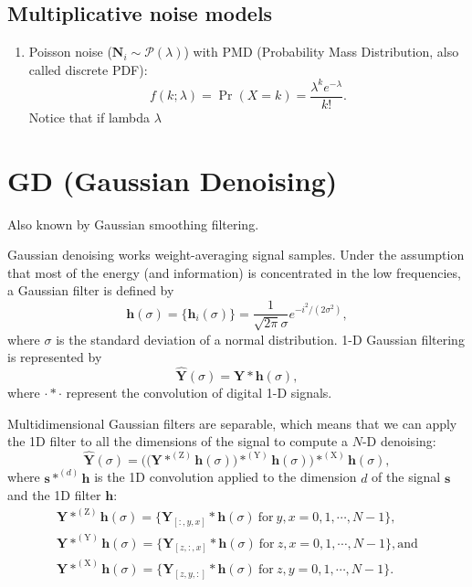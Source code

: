\documentclass{article}
\begin{document}
\subsection{Multiplicative noise models}
\begin{enumerate}
\item Poisson noise ($\mathbf{N}_i\sim\mathcal{P}(\lambda)$) with PMD (Probability Mass Distribution, also
  called discrete PDF):
  \begin{equation}
    f(k; \lambda) = \Pr(X{=}k) = \frac{\lambda^k e^{-\lambda}}{k!}.
  \end{equation}
  Notice that if lambda $\lambda$
\end{enumerate}
\section{GD (Gaussian Denoising)}

Also known by Gaussian smoothing filtering.

Gaussian denoising works weight-averaging signal samples. Under the
assumption that most of the energy (and information) is concentrated
in the low frequencies, a Gaussian filter is defined by
\begin{equation}
  \mathbf{h}(\sigma) = \{\mathbf{h}_i(\sigma)\} = \frac{1}{\sqrt{2\pi}\sigma}e^{{-i}^2/(2\sigma^2)},
\end{equation}
where $\sigma$ is the standard deviation of a normal
distribution. 1-D Gaussian filtering is represented by
\begin{equation}
  \hat{\mathbf{Y}}(\sigma) = \mathbf{Y}*\mathbf{h}(\sigma),
  \label{eq:GF}
\end{equation}
where $\cdot*\cdot$ represent the convolution of digital 1-D signals.

Multidimensional Gaussian filters are separable, which means that we
can apply the 1D filter to all the dimensions of the signal to compute
a $N$-D denoising:
\begin{equation}
  \hat{\mathbf{Y}}(\sigma) = \Big(\big({\mathbf Y}*^{(\text{Z})}{\mathbf h}(\sigma)\big)*^{(\text{Y})}{\mathbf h}(\sigma)\Big)*^{(\text{X})}{\mathbf h}(\sigma),
    \label{eq:3DGF}
\end{equation}
where ${\mathbf s}*^{(d)}{\mathbf h}$ is the 1D convolution applied to
the dimension $d$ of the signal ${\mathbf s}$ and the 1D filter
${\mathbf h}$:
\begin{equation*}
    \begin{array}{l}
    \mathbf{Y}*^{(\text{Z})}{\mathbf h}(\sigma)=\{{\mathbf Y}_{[:,y,x]}*{\mathbf h}(\sigma)~\text{for}~y,x=0,1,\cdots,N-1\},\\
    \mathbf{Y}*^{(\text{Y})}{\mathbf h}(\sigma)=\{{\mathbf Y}_{[z,:,x]}*{\mathbf h}(\sigma)~\text{for}~z,x=0,1,\cdots,N-1\}, \text{and}\\
    \mathbf{Y}*^{(\text{X})}{\mathbf h}(\sigma)=\{{\mathbf Y}_{[z,y,:]}*{\mathbf h}(\sigma)~\text{for}~z,y=0,1,\cdots,N-1\}.
    \end{array}
\end{equation*}
\end{document}
